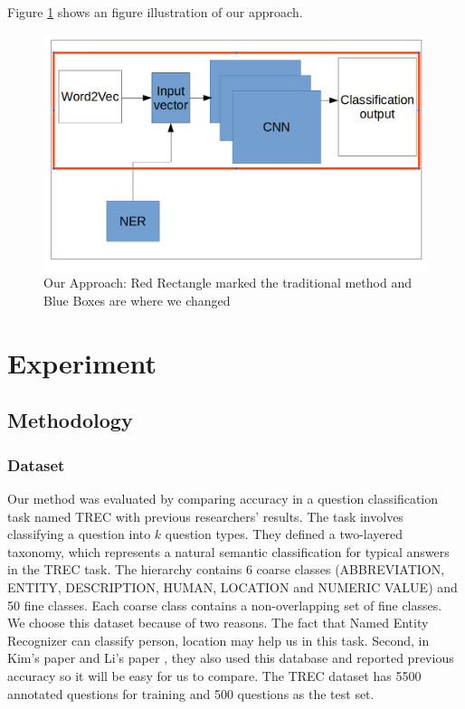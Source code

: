 \documentclass[10pt,twocolumn,letterpaper]{article}
\begin{document}
Figure \ref{process} shows an figure illustration of our approach.
 
\begin{figure}
  \includegraphics[width=\linewidth]{process.png}
  \caption{Our Approach: Red Rectangle marked the traditional method and Blue Boxes are where we changed}
  \label{process}
\end{figure}




\section{Experiment}
\subsection{Methodology}

\subsubsection{Dataset}
Our method was evaluated by comparing accuracy in a question classification task named TREC \cite{li2006learning} with previous researchers' results. The task involves classifying a question into $k$ question types. They defined a two-layered taxonomy, which represents a  natural semantic classification for typical answers in the TREC task. The hierarchy contains 6 coarse classes (ABBREVIATION, ENTITY, DESCRIPTION, HUMAN, LOCATION and NUMERIC VALUE) and 50 fine classes. Each coarse  class contains a non-overlapping set of fine classes. We choose this dataset because of two reasons. The fact that Named Entity Recognizer can classify person, location may help us in this task. Second, in Kim's paper \cite{kim2014convolutional} and Li's paper \cite{li2006learning}, they also used this database and reported previous accuracy so it will be easy for us to compare. The TREC dataset has 5500 annotated questions for training and 500 questions as the test set.
\end{document}
